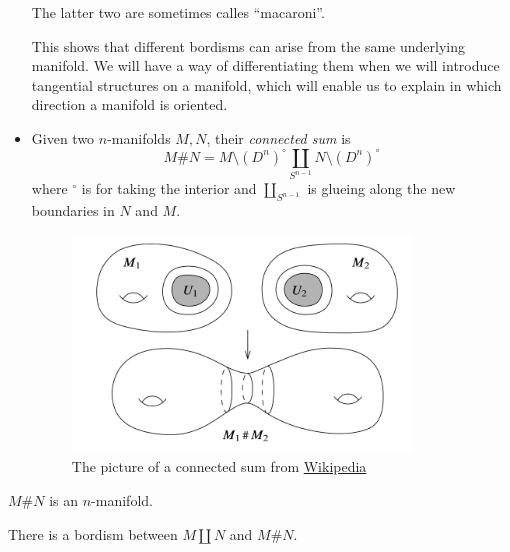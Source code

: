 \begin{ex}
\begin{itemize}
\begin{figure}[H]
\begin{subfigure}[t]{.4\textwidth}
    \end{subfigure}
    \end{figure}
    The latter two are sometimes calles ``macaroni''.
    
    This shows that different bordisms can arise from the same underlying manifold. We will have a way of differentiating them when we will introduce tangential structures on a manifold, which will enable us to explain in which direction a manifold is oriented.

    \item Given two $n$-manifolds $M,N$, their \textit{connected sum} is 
    \begin{equation*}
         M\# N=M\setminus(D^{n})^{\circ}\coprod_{S^{n-1}} N\setminus(D^{n})^{\circ}
     \end{equation*}
     where ${}^{\circ}$ is for taking the interior and $\coprod_{S^{n-1}}$ is glueing along the new boundaries in $N$ and $M$.
    \begin{figure}[!ht]
    \centering
    \captionsetup{labelformat=empty, format = hang}
        \begin{measuredfigure}
            \includegraphics[width=9cm]{images/Lecture 2/connected sum.png} \caption{\small{The picture of a connected sum from \href{https://en.wikipedia.org/wiki/Connected_sum]}{Wikipedia}}}
        \end{measuredfigure}
    \end{figure}
\end{itemize}
\end{ex}
\begin{prop}
    $M\# N$ is an $n$-manifold.
\end{prop}
\begin{lem}
    There is a bordism between $M\coprod N$ and $M\# N$.
\end{lem}

